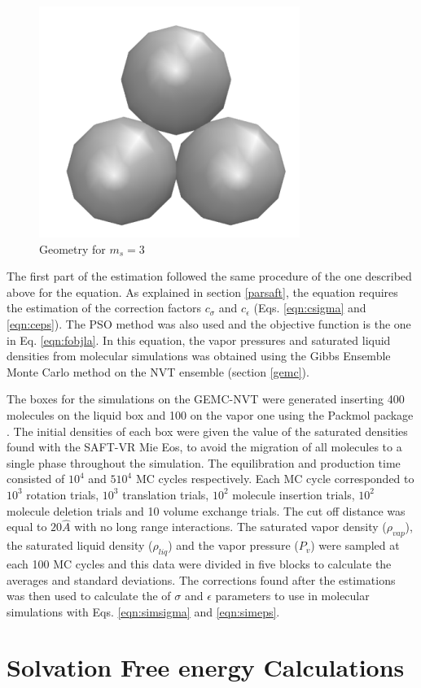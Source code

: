 \begin{figure}[th]
	\centering
	\includegraphics[width=0.15\linewidth]{Figures/fe3}
	\caption{Geometry for $m_{s}=3$}
	\label{fig:fen3}
\end{figure}

The first part of the estimation followed the same procedure of the one described above for the  equation. As explained in section \ref{parsaft}, the  equation requires the estimation of the correction factors $c_{\sigma}$ and $c_{\epsilon}$ (Eqs. \eqref{eqn:csigma} and \eqref{eqn:ceps}). The PSO method was also used and the objective function is the one in Eq. \eqref{eqn:fobjla}. In this equation, the vapor pressures and saturated liquid densities from molecular simulations was obtained using the Gibbs Ensemble Monte Carlo method on the NVT ensemble  (section \ref{gemc}).

The boxes for the simulations on the GEMC-NVT were generated inserting 400 molecules on the liquid box and 100 on the vapor one using the Packmol package \cite{packmol}. The initial densities of each box were given the value of the saturated densities found with the SAFT-VR Mie Eos, to avoid the migration of all molecules to a single phase throughout the simulation. The equilibration and production time consisted of $10^{4}$ and $5 10^{4}$ MC cycles respectively. Each MC cycle corresponded to $10^3$ rotation trials, $10^3$ translation trials, $10^2$ molecule insertion trials, $10^2$ molecule deletion trials and 10 volume exchange trials. The cut off distance was equal to $20 \hat{A}$ with no long range interactions. The saturated vapor density ($\rho_{vap}$), the saturated liquid density ($\rho_{liq}$) and the vapor pressure ($P_{v}$) were sampled at each 100 MC cycles and this data were divided in five blocks to calculate the averages and standard deviations. The corrections found after the estimations was then used to calculate the of $\sigma$ and $\epsilon$ parameters to use in molecular simulations with Eqs. \eqref{eqn:simsigma} and \eqref{eqn:simeps}.

\section{Solvation Free energy Calculations}

